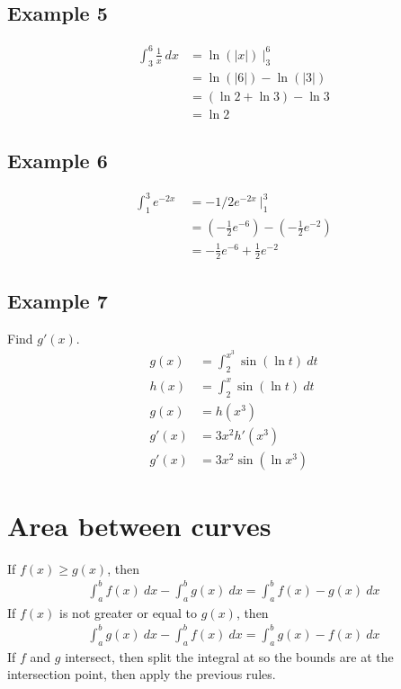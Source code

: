 \documentclass{article}
\theoremstyle{mytheoremstyle}
\theoremstyle{mytheoremstyle}
\theoremstyle{myproblemstyle}
\begin{document}
    \subsection*{Example 5}
    \begin{align*}
        \int_{3}^{6} \frac{1}{x} \ dx
        &= \ln(|x|) \ \Big|_3^6 \\
        &= \ln(|6|)-\ln(|3|) \\
        &= (\ln 2 + \ln 3) - \ln 3 \\
        &= \ln 2
    \end{align*}

    \subsection*{Example 6}
    \begin{align*}
        \int_{1}^{3} e^{-2x} \ 
        &= -1/2 e^{-2x} \ \Big|_{1}^{3} \\
        &= (-\frac{1}{2} e^{-6}) - (-\frac{1}{2} e^{-2}) \\
        &= -\frac{1}{2} e^{-6} + \frac{1}{2} e^{-2}
    \end{align*}

    \subsection*{Example 7}
    Find $g'(x)$.
    \begin{align*}
        g(x) &= \int_{2}^{x^3} \sin(\ln t) \ dt \\
        h(x) &= \int_{2}^{x} \sin(\ln t) \ dt \\
        g(x) &= h(x^3) \\
        g'(x)&= 3x^2h'(x^3) \\
        g'(x)&= 3x^2\sin(\ln x^3)
    \end{align*}

    \section*{Area between curves}
    If $f(x)\ge g(x)$, then
    \begin{align*}
        \int_{a}^{b} f(x) \ dx - \int_{a}^{b} g(x) \ dx = \int_{a}^{b} f(x)-g(x) \ dx
    \end{align*}
    If $f(x)$ is not greater or equal to $g(x)$, then
    \begin{align*}
        \int_{a}^{b} g(x) \ dx - \int_{a}^{b} f(x) \ dx = \int_{a}^{b} g(x)-f(x) \ dx
    \end{align*}
    If $f$ and $g$ intersect, then split the integral at so the bounds are at
    the intersection point, then apply the previous rules.
\end{document}
